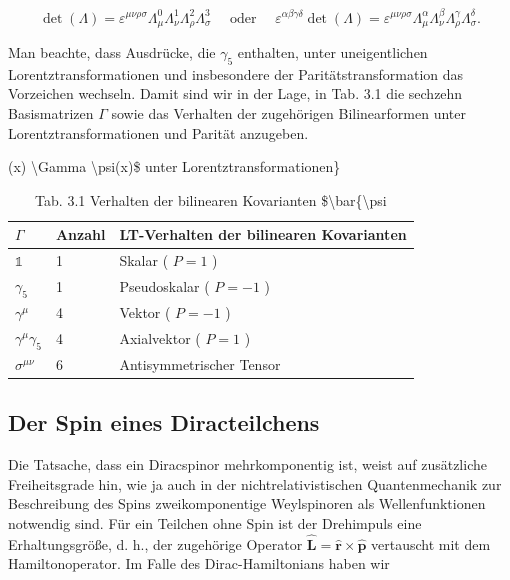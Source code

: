 \documentclass[10pt, letterpaper]{article}
\begin{document}
$$
\operatorname{det}(\Lambda)=\varepsilon^{\mu \nu \rho \sigma} \Lambda_{\mu}^{0} \Lambda_{\nu}^{1} \Lambda_{\rho}^{2} \Lambda_{\sigma}^{3} \quad \text { oder } \quad \varepsilon^{\alpha \beta \gamma \delta} \operatorname{det}(\Lambda)=\varepsilon^{\mu \nu \rho \sigma} \Lambda_{\mu}^{\alpha} \Lambda_{\nu}^{\beta} \Lambda_{\rho}^{\gamma} \Lambda_{\sigma}^{\delta} .
$$

Man beachte, dass Ausdrücke, die $\gamma_{5}$ enthalten, unter uneigentlichen Lorentztransformationen und insbesondere der Paritätstransformation das Vorzeichen wechseln. Damit sind wir in der Lage, in Tab. 3.1 die sechzehn Basismatrizen $\Gamma$ sowie das Verhalten der zugehörigen Bilinearformen unter Lorentztransformationen und Parität anzugeben.

\begin{table}[h]
\begin{center}

\caption{Tab. 3.1 Verhalten der bilinearen Kovarianten \$\textbackslash bar\{\textbackslash psi}(x) \textbackslash Gamma \textbackslash psi(x)\$ unter Lorentztransformationen\}\\
\begin{tabular}{|l|l|l|}
\hline
$\Gamma$ & Anzahl & LT-Verhalten der bilinearen Kovarianten \\
\hline
$\mathbb{1}$ & 1 & Skalar ( $P=1$ ) \\
\hline
$\gamma_{5}$ & 1 & Pseudoskalar ( $P=-1$ ) \\
\hline
$\gamma^{\mu}$ & 4 & Vektor ( $P=-1$ ) \\
\hline
$\gamma^{\mu} \gamma_{5}$ & 4 & Axialvektor ( $P=1$ ) \\
\hline
$\sigma^{\mu \nu}$ & 6 & Antisymmetrischer Tensor \\
\hline
\end{tabular}
\end{center}
\end{table}





\pagebreak



\subsection{Der Spin eines Diracteilchens}
Die Tatsache, dass ein Diracspinor mehrkomponentig ist, weist auf zusätzliche Freiheitsgrade hin, wie ja auch in der nichtrelativistischen Quantenmechanik zur Beschreibung des Spins zweikomponentige Weylspinoren als Wellenfunktionen notwendig sind. Für ein Teilchen ohne Spin ist der Drehimpuls eine Erhaltungsgröße, d. h., der zugehörige Operator $\hat{\mathbf{L}}=\hat{\mathbf{r}} \times \hat{\mathbf{p}}$ vertauscht mit dem Hamiltonoperator. Im Falle des Dirac-Hamiltonians haben wir
\end{document}

